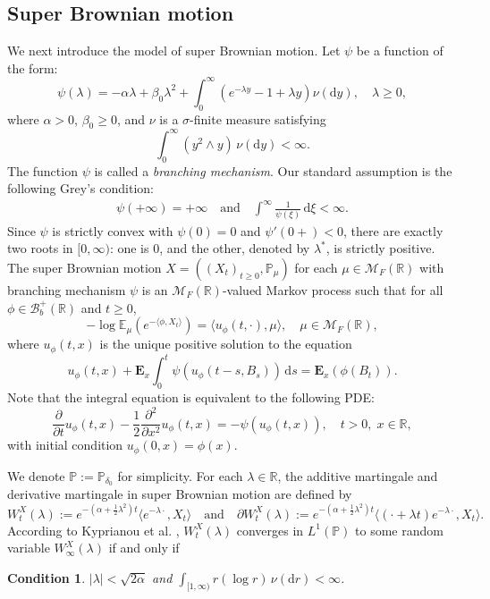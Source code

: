 \documentclass[10pt,a4paper]{amsart}
\newtheorem{con1}[con0]{Condition}
\numberwithin{equation}{section}
\def\bgcondition{\begin{con1}}\def\edcondition{\end{con1}}
\begin{document}
\subsection{Super Brownian motion}
We next introduce the model of super Brownian motion. Let $\psi$ be a function of the form:
\begin{equation}\label{branching mechan}
		\psi(\lambda) = -\alpha \lambda + 
        \beta_0\lambda^2 + \int_0^\infty \left(e^{-\lambda y} - 1 + \lambda y\right) \nu(\mathrm{d}y), \quad \lambda \ge 0,
\end{equation}
where $\alpha > 0$, $
\beta_0\ge 0$, and $\nu$ is a $\sigma$-finite measure satisfying
\[
\int_0^\infty (y^2 \wedge y) \, \nu(\mathrm{d}y) < \infty.
\]
The function $\psi$ is called a {\it branching mechanism}. Our standard assumption is the following Grey's condition:
\begin{align}\label{Grey's-condition}
	\psi(+\infty) = +\infty \quad \text{and} \quad \int^\infty \frac{1}{\psi(\xi)} \, \mathrm{d}\xi < \infty.
\end{align}
Since $\psi$ is strictly convex with $\psi(0) = 0$ and $\psi'(0+) < 0$, there are exactly two roots in $[0, \infty)$: one is $0$, and the other, denoted by $\lambda^*$, is strictly positive.  
The super Brownian motion $X = ((X_t)_{t \geq 0}, \mathbb{P}_\mu)$ for each $\mu \in \mathcal{M}_F(\mathbb{R})$ with branching mechanism $\psi$ is an $\mathcal{M}_F(\mathbb{R})$-valued Markov process such that for all $\phi \in \mathcal{B}_b^+(\mathbb{R})$ and $t \geq 0$,
\[
-\log \mathbb{E}_{\mu}\left(e^{-\langle \phi, X_t \rangle}\right) = \langle u_{\phi}(t, \cdot), \mu \rangle, \quad \mu \in \mathcal{M}_F(\mathbb{R}),
\]
where $u_{\phi}(t, x)$ is the unique positive solution to the equation
\[
u_{\phi}(t, x) + \mathbf{E}_x \int_0^t \psi(u_{\phi}(t - s, B_s)) \, \mathrm{d}s = \mathbf{E}_x(\phi(B_t)).
\]
Note that the integral equation is equivalent to the following PDE:
	\begin{equation*} 
		\frac{\partial}{\partial t} u_{\phi}(t, x) - \frac{1}{2} \frac{\partial^2}{\partial x^2} u_{\phi}(t, x) = -\psi(u_{\phi}(t, x)), \quad t > 0, \; x \in \mathbb{R},
\end{equation*} 
with initial condition $u_{\phi}(0, x) = \phi(x)$.


We denote $\mathbb{P}:=\mathbb{P}_{\delta_0}$ for simplicity. For each $\lambda\in \mathbb{R}$, the additive martingale and derivative martingale in super Brownian motion are defined by
\[
W_t^X(\lambda) := e^{-(\alpha + \frac{1}{2}\lambda^2)t} \langle e^{-\lambda \cdot}, X_t \rangle
\quad \text{and} \quad
\partial W_t^X(\lambda) := e^{-(\alpha + \frac{1}{2}\lambda^2)t} \langle (\cdot + \lambda t) e^{-\lambda \cdot}, X_t \rangle.
\]
According to Kyprianou et al. \cite{KLMR12},  $W_t^X(\lambda)$ converges in $L^1(\mathbb{P})$ to some random variable $W_\infty^X(\lambda)$ if and only if
\bgcondition\label{cond3}
$|\lambda| < \sqrt{2\alpha}$ and $\displaystyle \int_{[1,\infty)} r (\log r) \, \nu(\mathrm{d}r) < \infty$.
\edcondition
\end{document}
